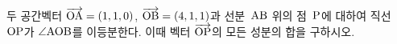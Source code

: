 두 공간벡터 $\overrightarrow{\mathrm{OA}}=(1{,}\mkern3mu\mathopen{}1{,}\mkern3mu\mathopen{}0)$, $\overrightarrow{\mathrm{OB}}=(4{,}\mkern3mu\mathopen{}1{,}\mkern3mu\mathopen{}1)$과 선분~$\mathrm{AB}$ 위의 점~$\mathrm{P}$에 대하여 직선~$\mathrm{OP}$가 $\angle\mathrm{AOB}$를 이등분한다. 이때 벡터 $\overrightarrow{\mathrm{OP}}$의 모든 성분의 합을 구하시오.
